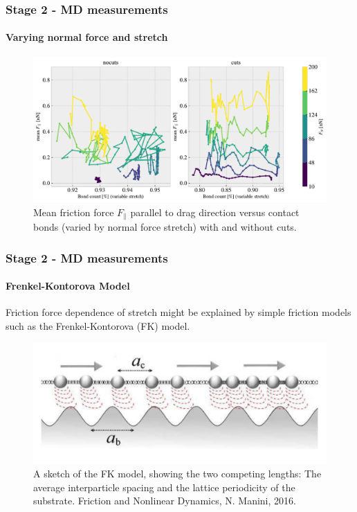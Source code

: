 \documentclass[
	10pt, %
]{beamer}
\begin{document}
\begin{frame}
	\frametitle{Stage 2 - MD measurements}
	\framesubtitle{Varying normal force and stretch}
	\begin{figure}
		\includegraphics[width=\linewidth]{figures/multi6.pdf}
		\caption{Mean friction force $F_{\parallel}$ parallel to drag direction versus contact bonds (varied by normal force stretch) with and without cuts.}
	\end{figure}	
\end{frame}


\begin{frame}
	\frametitle{Stage 2 - MD measurements}
	\framesubtitle{Frenkel-Kontorova Model}

	Friction force dependence of stretch might be explained by simple friction models such as the Frenkel-Kontorova (FK) model.

	\begin{figure}
		\includegraphics[width=0.7\linewidth]{figures/FK_model.png}
		\caption{A sketch of the FK model, showing the two competing lengths: The average interparticle spacing and the lattice periodicity of the substrate. Friction and Nonlinear Dynamics, N. Manini, 2016.}
	\end{figure}

\end{frame}
\end{document}
